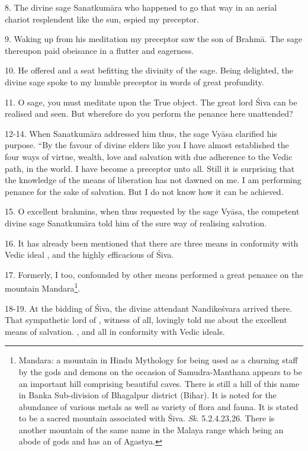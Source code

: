 8. The divine sage Sanatkumāra who happened to go that way in an aerial chariot
resplendent like the sun, espied my preceptor.

9. Waking up from his meditation my preceptor saw the son of Brahmā. The sage
thereupon paid obeisance in a flutter and eagerness.

10. He offered  and a seat befitting the divinity of the sage. Being
delighted, the divine sage spoke to my humble preceptor in words of great
profundity.

11. O sage, you must meditate upon the True object. The great lord Śiva can be
realised and seen. But wherefore do you perform the penance here unattended?

12-14. When Sanatkumāra addressed him thus, the sage Vyāsa clarified his purpose.
“By the favour of divine elders like you I have almost established the four ways
of virtue, wealth, love and salvation with due adherence to the Vedic path, in
the world. I have become a preceptor unto all. Still it is surprising that
the knowledge of the means of liberation has not dawned on me. I am performing
penance for the sake of salvation. But I do not know how it can be achieved.

15. O excellent brahmins, when thus requested by the sage Vyāsa, the competent
divine sage Sanatkumāra told him of the sure way of realising salvation.

16. It has already been mentioned that there are three means in conformity with
Vedic ideal \viz {},  and the highly efficacious 
of Śiva.

17. Formerly, I too, confounded by other means performed a great penance on
the mountain Mandara\footnote{Mandara: a mountain in Hindu Mythology for being
used as a churning staff by the gods and demons on the occasion of
Samudra-Manthana appears to be an important hill comprising beautiful caves.
There is still a hill of this name in Banka Sub-division of Bhagalpur district
(Bihar). It is noted for the abundance of various metals as well as variety of
flora and fauna. It is stated to be a sacred mountain associated with Śiva.
\emph{Sk}. 5.2.4.23,26. There is another mountain of the same name in the Malaya
range which being an abode of gods and  has an  of Agastya.}.

18-19. At the bidding of Śiva, the divine attendant Nandikeśvara arrived there.
That sympathetic lord of , witness of all, lovingly told me about
the excellent means of salvation. \Viz {},  and 
all in conformity with Vedic ideals.

